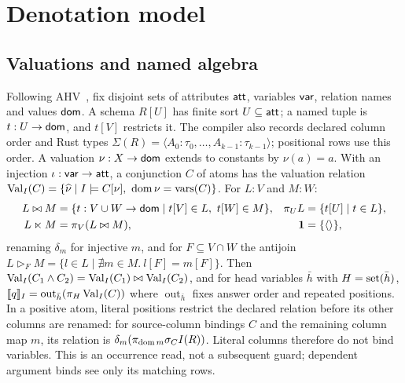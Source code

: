 \section{Denotation model}
\label{sec:denotation}\label{sec:scope}

\subsection{Valuations and named algebra}
\label{sec:valuations}
Following AHV~\cite[Sections 3.1--3.3, 4.2]{ahv}, fix disjoint sets of
attributes $\mathsf{att}$, variables $\mathsf{var}$, relation names and values $\mathsf{dom}$. A schema
$R[U]$ has finite sort $U\subseteq\mathsf{att}$; a named tuple is $t:U\to\mathsf{dom}$, and
$t[V]$ restricts it. The compiler also records declared column order and Rust
types $\Sigma(R)=\langle A_0:\tau_0,\ldots,A_{k-1}:\tau_{k-1}\rangle$; positional
rows use this order. A valuation $\nu:X\to\mathsf{dom}$ extends to constants by
$\nu(a)=a$. With an injection $\iota:\mathsf{var}\to\mathsf{att}$, a conjunction $C$ of atoms
has the valuation relation~\cite{notes}
$\Val_I(C)=\{\widehat\nu\mid I\models C[\nu],\ \dom\nu=\vars(C)\}$.
For $L:V$ and $M:W$:
\[
\begin{aligned}
 L\bowtie M&=\{t:V\cup W\to\mathsf{dom}\mid t[V]\in L,\ t[W]\in M\},&
 \pi_UL&=\{t[U]\mid t\in L\},\\
 L\ltimes M&=\pi_V(L\bowtie M),& \mathbf1&=\{\langle\rangle\},
\end{aligned}
\]
renaming $\delta_m$ for injective $m$, and for $F\subseteq V\cap W$ the antijoin
$L\triangleright_FM=\{l\in L\mid\nexists m\in M.\ l[F]=m[F]\}$.
Then $\operatorname{Val}_I(C_1\land C_2)=\operatorname{Val}_I(C_1)\bowtie\operatorname{Val}_I(C_2)$, and for head variables
$\bar h$ with $H=\operatorname{set}(\bar h)$,
$\llbracket q\rrbracket_I=\operatorname{out}_{\bar h}(\pi_H\operatorname{Val}_I(C))$ where
$\operatorname{out}_{\bar h}$ fixes answer order and repeated positions.
In a positive atom, literal positions restrict the declared relation before
its other columns are renamed: for source-column bindings $C$ and the remaining
column map $m$, its relation is $\delta_m(\pi_{\operatorname{dom} m}\sigma_C I(R))$.
Literal columns therefore do not bind variables. This is an occurrence read,
not a subsequent guard; dependent argument binds see only its matching rows.


